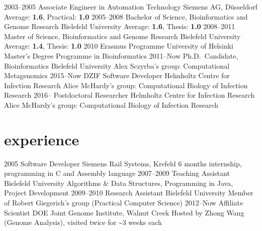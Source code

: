 \documentclass[print]{friggeri-cv}
\begin{document}
\begin{entrylist}
\entry
{2003--2005}
{Associate Engineer {\normalfont in Automation Technology}}
{Siemens AG, Düsseldorf}
{Average: \textbf{1.6}, Practical: \textbf{1.0}}
\entry
{2005--2008}
{Bachelor {\normalfont of Science,} Bioinformatics and Genome Research}
{Bielefeld University}
{Average: \textbf{1.6}, Thesis: \textbf{1.0}}
\entry
{2008--2011}
{Master {\normalfont of Science,} Bioinformatics and Genome Research}
{Bielefeld University}
{Average: \textbf{1.4}, Thesis: \textbf{1.0}}
\entry
{2010}
{Erasmus Programme}%
{University of Helsinki}
{Master's Degree Programme in Bioinformatics}
\entry
{2011--Now}
{Ph.D.\ {\normalfont Candidate,} Bioinformatics}
{Bielefeld University}
{Alex Sczyrba's group: Computational Metagenomics}
\entry
{2015--Now}
{DZIF Software Developer}
{Helmholtz Centre for Infection Research}
{Alice McHardy's group: Computational Biology of Infection Research}
\entry
{2016--}
{Postdoctoral Researcher}
{Helmholtz Centre for Infection Research}
{Alice McHardy's group: Computational Biology of Infection Research}
\end{entrylist}


\section{experience}

\begin{entrylist}
\entry
{2005}
{Software Developer}
{Siemens Rail Systems, Krefeld}
{6 months internship, programming in C and Assembly language}
\entry
{2007--2009}
{Teaching Assistant}
{Bielefeld University}
{Algorithms \& Data Structures, Programming in Java, Project Development}
\entry
{2009--2010}
{Research Assistant}
{Bielefeld University}
{Member of Robert Giegerich's group (Practical Computer Science)}
\entry
{2012--Now}
{Affiliate Scientist}
{DOE Joint Genome Institute, Walnut Creek}
{Hosted by Zhong Wang (Genome Analysis), visited twice for \textasciitilde 3 weeks each}
\end{entrylist}
\end{document}
